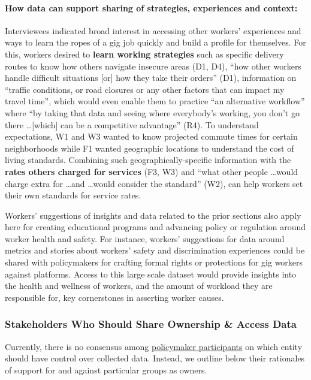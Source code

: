 \paragraph{How data can support sharing of strategies, experiences and context: }Interviewees indicated broad interest in accessing other workers' experiences and ways to learn the ropes of a gig job quickly and build a profile for themselves. For this, workers desired to \textbf{learn working strategies} such as specific delivery routes to know how others navigate insecure areas (D1, D4), ``how other workers handle difficult situations [or] how they take their orders'' (D1), information on ``traffic conditions, or road closures or any other factors that can impact my travel time'', which would even enable them to practice ``an alternative workflow'' where ``by taking that data and seeing where everybody's working, you don't go there  \dots  [which] can be a competitive advantage'' (R4). To understand expectations, W1 and W3 wanted to know projected commute times for certain neighborhoods while F1 wanted geographic locations to understand the cost of living standards. Combining such geographically-specific information with the
\textbf{rates others charged for services} (F3, W3) and ``what other people  \dots  would charge extra for  \dots  and \dots would consider the standard'' (W2), can help workers set their own standards for service rates.

Workers' suggestions of insights and data related to the prior sections also apply here for creating educational programs and  advancing policy or regulation around worker health and safety. For instance, workers’ suggestions for data around metrics and stories about workers’ safety and discrimination experiences could be shared with policymakers for crafting formal rights or protections for gig workers against platforms. Access to this large scale dataset would provide insights into the health and wellness of workers, and the amount of workload they are responsible for, key cornerstones in asserting worker causes.

\subsubsection{{Stakeholders Who Should Share Ownership \& Access Data}}\label{ownership}

Currently, there is no consensus {among \uline{policymaker participants}} on which entity should have control over collected data{. Instead, we} outline {below their} rationales of support for and against particular groups as owners.

